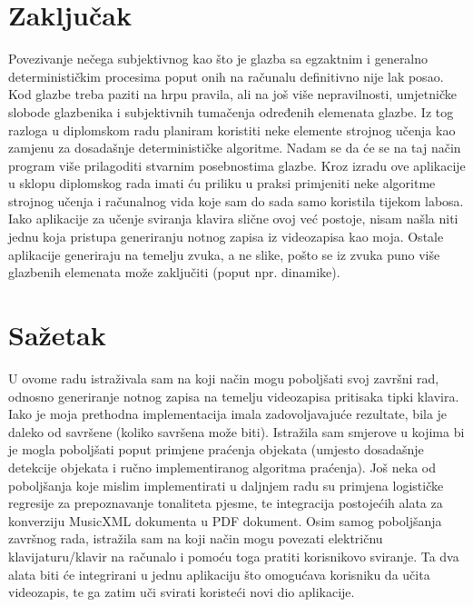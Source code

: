 \documentclass[times, utf8, seminar, numeric]{fer}
\begin{document}
\chapter{Zaključak}
Povezivanje nečega subjektivnog kao što je glazba sa egzaktnim i generalno determinističkim procesima poput onih na računalu definitivno nije lak posao. Kod glazbe treba paziti na hrpu pravila, ali na još više nepravilnosti, umjetničke slobode glazbenika i subjektivnih tumačenja određenih elemenata glazbe. Iz tog razloga u diplomskom radu planiram koristiti neke elemente strojnog učenja kao zamjenu za dosadašnje determinističke algoritme. Nadam se da će se na taj način program više prilagoditi stvarnim posebnostima glazbe. Kroz izradu ove aplikacije u sklopu diplomskog rada imati ću priliku u praksi primjeniti neke algoritme strojnog učenja i računalnog vida koje sam do sada samo koristila tijekom labosa.\\

Iako aplikacije za učenje sviranja klavira slične ovoj već postoje, nisam našla niti jednu koja pristupa generiranju notnog zapisa iz videozapisa kao moja. Ostale aplikacije generiraju na temelju zvuka, a ne slike, pošto se iz zvuka puno više glazbenih elemenata može zaključiti (poput npr. dinamike).\\
 



\chapter{Sažetak}
U ovome radu istraživala sam na koji način mogu poboljšati svoj završni rad, odnosno generiranje notnog zapisa na temelju videozapisa pritisaka tipki klavira. Iako je moja prethodna implementacija imala zadovoljavajuće rezultate, bila je daleko od savršene (koliko savršena može biti). Istražila sam smjerove u kojima bi je mogla poboljšati poput primjene praćenja objekata (umjesto dosadašnje detekcije objekata i ručno implementiranog algoritma praćenja). Još neka od poboljšanja koje mislim implementirati u daljnjem radu su primjena logističke regresije za prepoznavanje tonaliteta pjesme, te integracija postojećih alata za konverziju MusicXML dokumenta u PDF dokument. Osim samog poboljšanja završnog rada, istražila sam na koji način mogu povezati električnu klavijaturu/klavir na računalo i pomoću toga pratiti korisnikovo sviranje. Ta dva alata biti će integrirani u jednu aplikaciju što omogućava korisniku da učita videozapis, te ga zatim uči svirati koristeći novi dio aplikacije.
\end{document}
